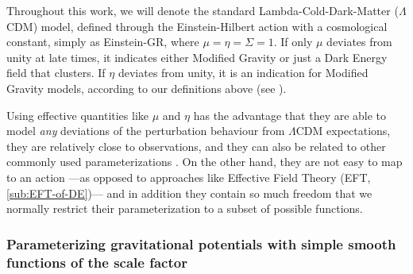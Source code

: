 Throughout this work, we will denote the standard Lambda-Cold-Dark-Matter ($\Lambda$CDM) model,
defined through the Einstein-Hilbert action with a cosmological constant, simply as Einstein-GR, where $\mu=\eta=\Sigma=1$. 
If only $\mu$ deviates from unity at late times,
it indicates either Modified Gravity or just a Dark Energy field that clusters.
If $\eta$ deviates from unity, it is an indication for Modified Gravity models, according to our definitions above 
(see \cite{Joyce, Lombrisier}).


Using effective quantities like $\mu$ and $\eta$ has the advantage
that they are able to model {\em any} deviations of the perturbation
behaviour from $\Lambda$CDM expectations, they are relatively close 
to observations, and they can also be related to other commonly used 
parameterizations \cite{pogosian_how_2010}.
On the other hand, they are not
easy to map to an action ---as opposed to approaches like Effective
Field Theory (EFT, \cref{sub:EFT-of-DE})---  and in addition they
contain so much freedom that we normally restrict their parameterization
to a subset of possible functions.


\subsubsection{Parameterizing gravitational potentials with simple smooth functions of the scale factor \label{sub:param-smooth-funct}}

